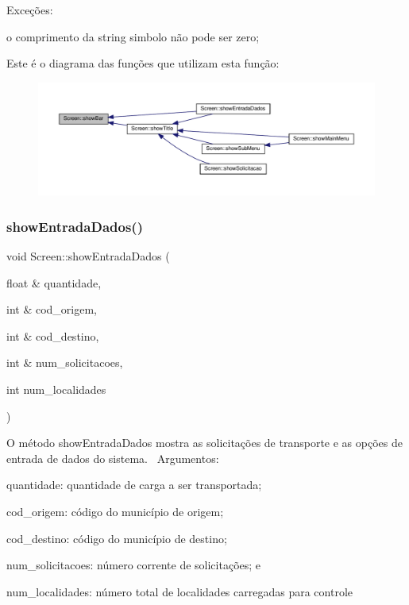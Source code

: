 Exceções\+:
\begin{DoxyItemize}
\item o comprimento da string simbolo não pode ser zero;
\end{DoxyItemize}Este é o diagrama das funções que utilizam esta função\+:\nopagebreak
\begin{figure}[H]
\begin{center}
\leavevmode
\includegraphics[width=350pt]{classScreen_a16bd8465322e12b669e26ecccd4a3704_icgraph}
\end{center}
\end{figure}
\mbox{\label{classScreen_a7b425f6ea8830066c837f84e09f493a0}} 
\subsubsection{\texorpdfstring{show\+Entrada\+Dados()}{showEntradaDados()}}
{\footnotesize\ttfamily void Screen\+::show\+Entrada\+Dados (\begin{DoxyParamCaption}\item[{float \&}]{quantidade,  }\item[{int \&}]{cod\+\_\+origem,  }\item[{int \&}]{cod\+\_\+destino,  }\item[{int \&}]{num\+\_\+solicitacoes,  }\item[{int}]{num\+\_\+localidades }\end{DoxyParamCaption})}

O método show\+Entrada\+Dados mostra as solicitações de transporte e as opções de entrada de dados do sistema.~\newline
Argumentos\+:
\begin{DoxyItemize}
\item quantidade\+: quantidade de carga a ser transportada;
\item cod\+\_\+origem\+: código do município de origem;
\item cod\+\_\+destino\+: código do município de destino;
\item num\+\_\+solicitacoes\+: número corrente de solicitações; e
\item num\+\_\+localidades\+: número total de localidades carregadas para controle
\end{DoxyItemize}

